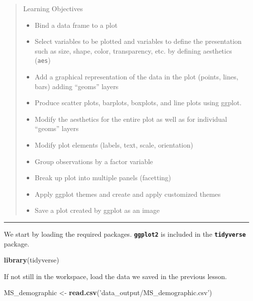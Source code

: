 \documentclass[]{book}
\newenvironment{Shaded}{\begin{snugshade}}{\end{snugshade}}
\newcommand{\KeywordTok}[1]{\textcolor[rgb]{0.13,0.29,0.53}{\textbf{#1}}}
\newcommand{\NormalTok}[1]{#1}
\newcommand{\StringTok}[1]{\textcolor[rgb]{0.31,0.60,0.02}{#1}}
\providecommand{\tightlist}{%
  \setlength{\itemsep}{0pt}\setlength{\parskip}{0pt}}
\begin{document}
\begin{quote}
Learning Objectives

\begin{itemize}
\tightlist
\item
  Bind a data frame to a plot
\item
  Select variables to be plotted and variables to define the presentation such as size, shape, color, transparency, etc. by defining aesthetics (\texttt{aes})
\item
  Add a graphical representation of the data in the plot (points, lines, bars) adding ``geoms'' layers
\item
  Produce scatter plots, barplots, boxplots, and line plots using ggplot.
\item
  Modify the aesthetics for the entire plot as well as for individual ``geoms'' layers
\item
  Modify plot elements (labels, text, scale, orientation)
\item
  Group observations by a factor variable
\item
  Break up plot into multiple panels (facetting)
\item
  Apply ggplot themes and create and apply customized themes
\item
  Save a plot created by ggplot as an image
\end{itemize}
\end{quote}

\begin{center}\rule{0.5\linewidth}{\linethickness}\end{center}

We start by loading the required packages. \textbf{\texttt{ggplot2}} is included in the \textbf{\texttt{tidyverse}} package.

\begin{Shaded}
\begin{Highlighting}[]
\KeywordTok{library}\NormalTok{(tidyverse)}
\end{Highlighting}
\end{Shaded}

If not still in the workspace, load the data we saved in the previous lesson.

\begin{Shaded}
\begin{Highlighting}[]
\NormalTok{MS_demographic <-}\StringTok{ }\KeywordTok{read.csv}\NormalTok{(}\StringTok{'data_output/MS_demographic.csv'}\NormalTok{)}
\end{Highlighting}
\end{Shaded}
\end{document}
